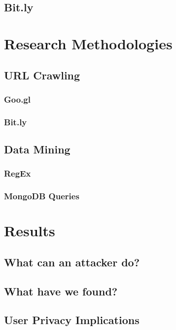 \documentclass[12pt]{article}
\begin{document}
\subsection{Bit.ly}
	
\section{Research Methodologies}

\subsection{URL Crawling}

\subsubsection{Goo.gl}

\subsubsection{Bit.ly}

\subsection{Data Mining}

\subsubsection{RegEx}

\subsubsection{MongoDB Queries}

\section{Results}

\subsection{What can an attacker do?}

\subsection{What have we found?}

\subsection{User Privacy Implications}
\end{document}

